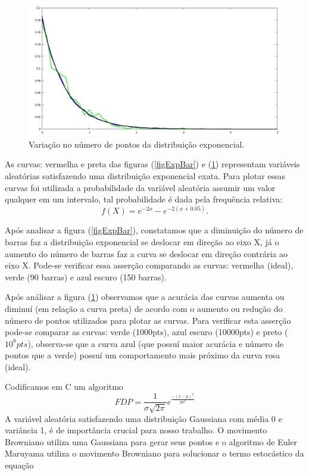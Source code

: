 \begin{figure}[!htb]
\centering
\begin{minipage}[b]{0.9\linewidth}
\includegraphics[width=\linewidth]{./img/Distribuicoes/expVarpt.jpg}
\caption{Variação no número de pontos da distribuição exponencial.}
\label{figExpPt}
\end{minipage} \hfill
\end{figure}


As curvas: vermelha e preta das figuras (\ref{figExpBar}) e (\ref{figExpPt}) representam variáveis aleatórias satisfazendo uma distribuição exponencial exata. Para plotar essas curvas foi utilizada a probabilidade da variável aleatória assumir um valor qualquer em um intervalo, tal probabilidade é dada pela frequência relativa:
\begin{equation}
f(X) = e^{-2x} - e^{-2(x+ 0.05)}.
\end{equation}

Após analisar a figura (\ref{figExpBar}), constatamos que a diminuição do número de barras faz a distribuição exponencial se deslocar em direção ao eixo X, já o aumento do número de barras  faz a curva se deslocar em direção contrária ao eixo X. Pode-se verificar essa asserção comparando as curvas: vermelha (ideal), verde (90 barras) e azul escuro (150 barras). 

Após análisar a figura (\ref{figExpPt}) observamos que a acurácia das curvas aumenta ou diminuí (em relação a curva preta) de acordo com o aumento ou redução do número de pontos utilizados para plotar as curvas. Para verificar esta asserção pode-se comparar as curvas: verde (1000pts), azul escuro (10000pts) e preto ($10^{8}pts$), observa-se que a curva azul (que possuí maior acurácia e número de pontos que a verde) possuí um comportamento mais próximo da curva rosa (ideal).

Codificamos em C  um algoritmo %
\begin{equation}
FDP = \frac{1}{ \sigma  \sqrt{2 \pi } } e^{ \frac{-(x - \mu )^{2}}{{2 \sigma ^{2}}}}
\end{equation}
A variável aleatória satisfazendo uma distribuição Gaussiana com média 0 e variância 1, é de importância crucial para nosso trabalho. O movimento Browniano utiliza uma Gaussiana para gerar seus pontos e o algoritmo de Euler Maruyama utiliza o movimento Browniano para solucionar o termo estocástico da equação %

